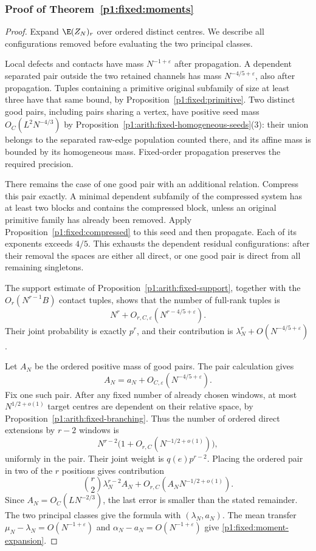 \subsubsection{Proof of Theorem~\ref{p1:fixed:moments}}
\label{p14:comp:fixed-moments}

\begin{proof}
Expand \(\E(Z_N)_r\) over ordered distinct centres.
We describe all configurations removed before evaluating
the two principal classes.

Local defects and contacts have mass \(N^{-1+\varepsilon}\)
after propagation. A dependent separated pair outside
the two retained channels has mass
\(N^{-4/5+\varepsilon}\), also after propagation.
Tuples containing a primitive original subfamily of
size at least three have that same bound, by
Proposition~\ref{p1:fixed:primitive}.
Two distinct good pairs, including pairs sharing a vertex, have
positive seed mass $O_C(L^2N^{-4/3})$ by
Proposition~\ref{p1:arith:fixed-homogeneous-seeds}(3): their union
belongs to the separated raw-edge population counted there, and
its affine mass is bounded by its homogeneous mass. Fixed-order
propagation preserves the required precision.

There remains the case of one good pair with an
additional relation. Compress this pair exactly.
A minimal dependent subfamily of the compressed
system has at least two blocks and contains the
compressed block, unless an original primitive family
has already been removed. Apply
Proposition~\ref{p1:fixed:compressed} to this seed and
then propagate. Each of its exponents exceeds \(4/5\).
This exhausts the dependent residual configurations:
after their removal the spaces are either all direct,
or one good pair is direct from all remaining
singletons.

The support estimate
of Proposition~\ref{p1:arith:fixed-support}, together with
the \(O_r(N^{r-1}B)\) contact tuples, shows that the
number of full-rank tuples is
\[
 N^r+O_{r,C,\varepsilon}(N^{r-4/5+\varepsilon}).
\]
Their joint probability is exactly \(p^r\), and their
contribution is \(\lambda_N^r+O(N^{-4/5+\varepsilon})\).

Let \(A_N\) be the ordered positive mass of good pairs.
The pair calculation gives
\[
 A_N=a_N+O_{C,\varepsilon}(N^{-4/5+\varepsilon}).
\]
Fix one such pair. After any fixed number of already
chosen windows, at most \(N^{1/2+o(1)}\) target centres
are dependent on their relative space, by
Proposition~\ref{p1:arith:fixed-branching}. Thus the number of
ordered direct extensions by \(r-2\) windows is
\[
 N^{r-2}\bigl(1+O_{r,C}(N^{-1/2+o(1)})\bigr),
\]
uniformly in the pair. Their joint weight is
\(q(e)p^{r-2}\). Placing the ordered pair in two of
the \(r\) positions gives contribution
\[
 \binom r2\lambda_N^{r-2}A_N
       +O_{r,C}(A_NN^{-1/2+o(1)}).
\]
Since \(A_N=O_C(LN^{-2/3})\), the last error is
smaller than the stated remainder. The two principal
classes give the formula with \((\lambda_N,a_N)\).
The mean transfer
\(\mu_N-\lambda_N=O(N^{-1+\varepsilon})\) and
\(\alpha_N-a_N=O(N^{-1+\varepsilon})\) give
\eqref{p1:fixed:moment-expansion}.


\end{proof}
